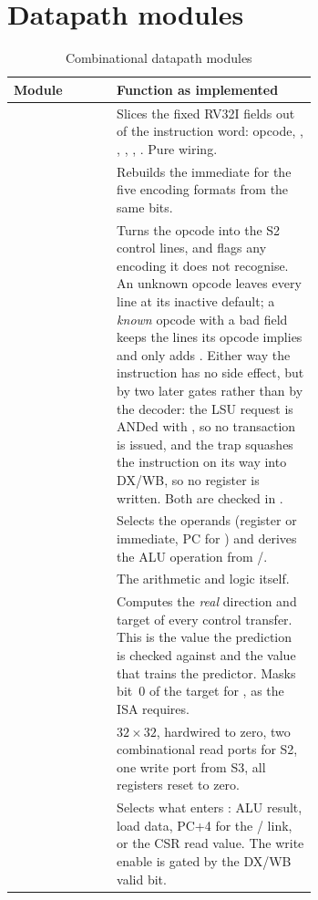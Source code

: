 \section{Datapath modules}

\begin{table}[H]
\centering
\caption{Combinational datapath modules}
\label{tab:datapath}
\begin{tabular}{@{}lL{0.66\linewidth}@{}}
\toprule
\textbf{Module} & \textbf{Function as implemented} \\
\midrule
{}  & Slices the fixed RV32I fields out of the instruction word: opcode, ,
                   , , , . Pure wiring. \\
 & Rebuilds the immediate for the five encoding formats from the same bits. \\
 & Turns the opcode into the S2 control lines, and flags any encoding it does
                   not recognise. An unknown opcode leaves every line at its inactive default;
                   a \emph{known} opcode with a bad  field keeps the lines its opcode
                   implies and only adds . Either way the instruction has no side
                   effect, but by two later gates rather than by the decoder: the LSU request is
                   ANDed with , so no transaction is issued, and the trap squashes
                   the instruction on its way into DX/WB, so no register is written. Both are
                   checked in . \\
 & Selects the operands (register or immediate, PC for ) and derives
                   the ALU operation from /. \\
     & The arithmetic and logic itself. \\
 & Computes the \emph{real} direction and target of every control transfer.
                   This is the value the prediction is checked against and the value that trains
                   the predictor. Masks bit~0 of the target for , as the ISA requires. \\
 & $32\times32$,  hardwired to zero, two combinational read ports for S2,
                   one write port from S3, all registers reset to zero. \\
 & Selects what enters : ALU result, load data, PC+4 for the
                   / link, or the CSR read value. The write enable is gated by
                   the DX/WB valid bit. \\
\bottomrule
\end{tabular}
\end{table}

